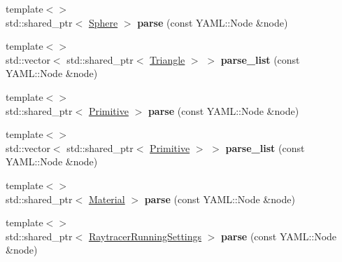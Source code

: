 \begin{DoxyCompactItemize}
\item 
\mbox{\label{classomg_1_1_y_a_m_l_parser_a50793579e616dc6ec88a617d74080786}} 
{\footnotesize template$<$$>$ }\\std\+::shared\+\_\+ptr$<$ \mbox{\hyperlink{classomg_1_1_sphere}{Sphere}} $>$ {\bfseries parse} (const Y\+A\+M\+L\+::\+Node \&node)
\item 
\mbox{\label{classomg_1_1_y_a_m_l_parser_ab6a6ffe5e8dd000873db4f9814274c80}} 
{\footnotesize template$<$$>$ }\\std\+::vector$<$ std\+::shared\+\_\+ptr$<$ \mbox{\hyperlink{classomg_1_1_triangle}{Triangle}} $>$ $>$ {\bfseries parse\+\_\+list} (const Y\+A\+M\+L\+::\+Node \&node)
\item 
\mbox{\label{classomg_1_1_y_a_m_l_parser_a039cf7c78c0cfc5efec22841aea56380}} 
{\footnotesize template$<$$>$ }\\std\+::shared\+\_\+ptr$<$ \mbox{\hyperlink{classomg_1_1_primitive}{Primitive}} $>$ {\bfseries parse} (const Y\+A\+M\+L\+::\+Node \&node)
\item 
\mbox{\label{classomg_1_1_y_a_m_l_parser_ab0baf9cfe2c38f4f347458ecb4d4939c}} 
{\footnotesize template$<$$>$ }\\std\+::vector$<$ std\+::shared\+\_\+ptr$<$ \mbox{\hyperlink{classomg_1_1_primitive}{Primitive}} $>$ $>$ {\bfseries parse\+\_\+list} (const Y\+A\+M\+L\+::\+Node \&node)
\item 
\mbox{\label{classomg_1_1_y_a_m_l_parser_a2c72beefd1858a812f5cec59c8536d0f}} 
{\footnotesize template$<$$>$ }\\std\+::shared\+\_\+ptr$<$ \mbox{\hyperlink{classomg_1_1_material}{Material}} $>$ {\bfseries parse} (const Y\+A\+M\+L\+::\+Node \&node)
\item 
\mbox{\label{classomg_1_1_y_a_m_l_parser_a0d8c854b90d0f732896e189f97891ed4}} 
{\footnotesize template$<$$>$ }\\std\+::shared\+\_\+ptr$<$ \mbox{\hyperlink{structomg_1_1_raytracer_running_settings}{Raytracer\+Running\+Settings}} $>$ {\bfseries parse} (const Y\+A\+M\+L\+::\+Node \&node)
\item 
\mbox{\label{classomg_1_1_y_a_m_l_parser_ad0148bff25d36e0f0a46ab52647e5ef7}} 

\end{DoxyCompactItemize}
